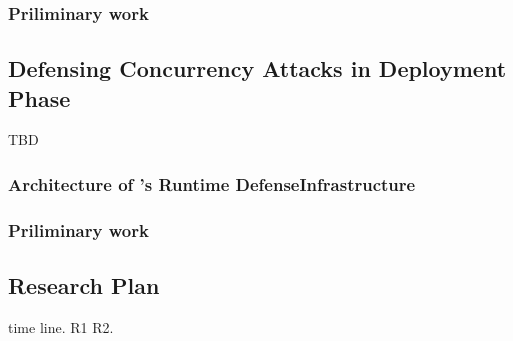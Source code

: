  

\subsubsection{Priliminary work}\label{sec:detect-result}


\subsection{Defensing Concurrency Attacks in Deployment Phase} 
\label{sec:defense}

TBD

\subsubsection{Architecture of \xxx's Runtime DefenseInfrastructure} 
\label{sec:defense-arch}




\subsubsection{Priliminary work} \label{sec:defense-result}


\subsection{Research Plan} \label{sec:rep}
time line. R1 R2.


